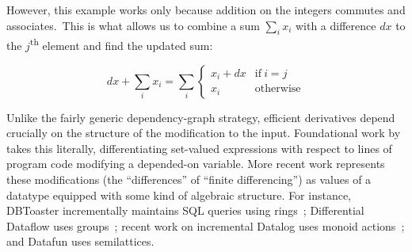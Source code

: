 However, this example works only because addition on the integers commutes and associates.\footnotemark\ This is what allows us to combine a sum $\sum_i x_i$ with a difference $dx$ to the $j$\textsuperscript{th} element and find the updated sum:


\[
dx + \sum_i x_i = \sum_i 
\begin{cases}
  x_i + dx & \text{if}~i = j\\
  x_i & \text{otherwise}
\end{cases}
\]

\noindent
Unlike the fairly generic dependency-graph strategy, efficient derivatives depend crucially on the structure of the modification to the input.
%
Foundational work by
\citet{DBLP:journals/toplas/PaigeK82} takes this literally, differentiating set-valued expressions with respect to lines of program code modifying a depended-on variable. More recent work represents these modifications (the ``differences'' of ``finite differencing'') as values of a datatype equipped with some kind of algebraic structure.
%
For instance, DBToaster incrementally maintains SQL queries using
rings~\citep{DBLP:conf/pods/Koch10,Koch:183766}; Differential Dataflow uses
groups~\citep{DBLP:conf/cidr/McSherryMII13}; recent work on incremental Datalog
uses monoid actions~\citep{DBLP:conf/esop/Alvarez-Picallo19}; and Datafun uses
semilattices.




